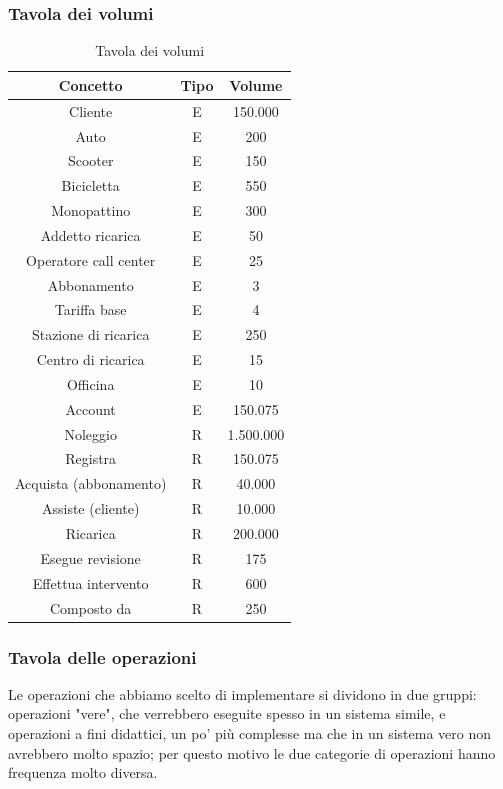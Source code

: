 \documentclass{article}
\begin{document}
\subsubsection{Tavola dei volumi}
\begin{table}[H]
    \centering
    \begin{tabular}{|c|c|c|}
        \hline
        Concetto & Tipo & Volume \\
        \hline
        Cliente & E &  150.000 \\
        Auto & E & 200  \\
        Scooter & E & 150  \\
        Bicicletta & E & 550  \\
        Monopattino & E & 300  \\
        Addetto ricarica & E & 50  \\
        Operatore call center & E & 25 \\
        Abbonamento & E & 3 \\
        Tariffa base & E & 4 \\
        Stazione di ricarica & E & 250 \\
        Centro di ricarica & E & 15 \\
        Officina & E & 10 \\
        Account & E & 150.075 \\
        Noleggio & R & 1.500.000 \\
        Registra & R & 150.075 \\
        Acquista (abbonamento) & R & 40.000  \\
        Assiste (cliente) & R & 10.000  \\
        Ricarica & R & 200.000 \\
        Esegue revisione & R & 175 \\ 
        Effettua intervento & R & 600 \\
        Composto da & R & 250 \\
        \hline
    \end{tabular}
    \caption{Tavola dei volumi}
    \label{tab:Tavola dei volumi}
\end{table}

\subsubsection{Tavola delle operazioni}

Le operazioni che abbiamo scelto di implementare si dividono in due gruppi: operazioni "vere", che verrebbero eseguite spesso in un sistema simile, e operazioni a fini didattici, un po' più complesse ma che in un sistema vero non avrebbero molto spazio; per questo motivo le due categorie di operazioni hanno frequenza molto diversa.
\end{document}
